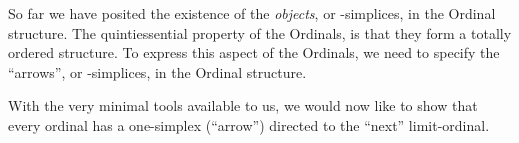 \documentclass[a4paper]{amsart}
\begin{document}
So far we have posited the existence of the \emph{objects}, or \zero-simplices,
in the Ordinal structure. The quintiessential property of the Ordinals, is that
they form a totally ordered structure. To express this aspect of the Ordinals,
we need to specify the ``arrows'', or \one-simplices, in the Ordinal structure.

\begin{deAxiom}
\hypothesis{\Gamma}{\judgement{\alpha}{\Ordinal_{\cdot}}}
\conclusion{\Gamma}{
  \judgement{\arrow{\alpha}{\successor{\alpha}}}{\Ordinal_{\rightarrow}}
}
\end{deAxiom}

\begin{deAxiom}
\conclusion{}{
  \judgement{\arrow{\zero}{\limitOrd{\zero}}}{\arrow{\Ordinal}{\Ordinal}}
}
\end{deAxiom}

\begin{deAxiom}
\hypothesis{\Gamma}{\judgement{\alpha}{\Ordinal_{\cdot}}}
\conclusion{\Gamma}{
  \judgement{\arrow{\limitOrd{\alpha}}{\limitOrd{\successor{\alpha}}}}{\Ordinal_{\rightarrow}}
}
\end{deAxiom}

\begin{deAxiom}
\hypothesis{\Gamma}{\judgement{\alpha}{\Ordinal_{\cdot}}}
\hypothesis{\Gamma}{\judgement{\beta}{\Ordinal_{\cdot}}}
\hypothesis{\Gamma}{\judgement{\arrow{\alpha}{\successor{\alpha}}}{\Ordinal_{\rightarrow}}}
\hypothesis{\Gamma}{\judgement{\arrow{\alpha}{\limitOrd{\beta}}}{\Ordinal_{\rightarrow}}}
\conclusion{\Gamma}{
  \judgement{\arrow{\successor{\alpha}}{\limitOrd{\beta}}}{\Ordinal_{\rightarrow}}
}
\end{deAxiom}


With the very minimal tools available to us, we would now like to show that
every ordinal has a one-simplex (``arrow'') directed to the ``next''
limit-ordinal.

\begin{deAxiom}
\hypothesis{\Gamma}{\judgement{\alpha}{\Ordinal_{\cdot}}}
\conclusion{\Gamma}{
  \judgement{\arrow{\limitOrd{\alpha}}{\limitOrd{\successor{\alpha}}}}{\Ordinal_{\rightarrow}}
}
\end{deAxiom}
\end{document}
